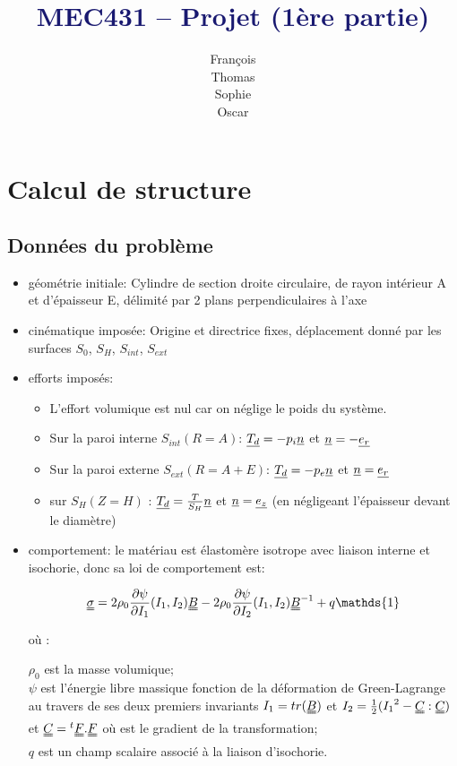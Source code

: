 \documentclass[a4paper,11pt]{article}
\newcommand{\titleinfo}{\textcolor{MidnightBlue}{MEC431 – Projet (1ère partie)}}
\newcommand{\tens}{\uuline}
\begin{document}
\title{\titleinfo}
\author{
	François 
	\\
	Thomas 
	\\
	Sophie 
	\\
	Oscar 
}
\date{}
\maketitle

\section{Calcul de structure}

\subsection{Données du problème}

\begin{itemize}
\item géométrie initiale:
Cylindre de section droite circulaire, de rayon intérieur A et d'épaisseur E, délimité par 2 plans perpendiculaires à l'axe
\item cinématique imposée:
Origine et directrice fixes, déplacement donné par les surfaces $S_{0}$,  $S_H$, $S_{int}$, $S_{ext}$
\item efforts imposés:
	\begin{itemize}
	\item L'effort volumique est nul car on néglige le poids du système.
	\item Sur la paroi interne $S_{int} (R=A)$:  $\uline{T_d} = -p_i \uline{n}$ et $\uline{n} =- \uline{e_r}$
	\item Sur la paroi externe $S_{ext} (R=A+E)$:  $\uline {T_d} = -p_e \uline{n}$ et $\uline{n} = \uline{e_r}$
	\item sur $S_H (Z=H)$ : $\uline{T_d} = \frac{T}{S_H}\uline{n}$ et $\uline{n} = \uline{e_z}$ (en négligeant l'épaisseur devant le diamètre)
	\end{itemize}
\item comportement: le matériau est élastomère isotrope avec liaison interne et isochorie, donc sa loi de comportement est:
\begin{center}
$$
\tens{\sigma}=2\rho_0\frac{\partial\psi}{\partial I_1}(I_1,I_2)\tens{B} -2\rho_0\frac{\partial\psi}{\partial I_2}(I_1,I_2) \tens{B}^{-1}+q\mathds{1}$$
\end{center}
où :
\begin{flushleft}
$\rho_0$ est la masse volumique;\\
$\psi$ est l'énergie libre massique fonction de la déformation de Green-Lagrange \tens{e} au travers de ses deux premiers invariants $I_1= tr(\tens{B})$ et $I_2=\frac{1}{2}({I_1}^2-\tens{C}:\tens{C})$ et $\tens{C} = {}^t\tens{F}.\tens{F}$ où \tens{F} est le gradient de la transformation;
\\
$q$ est un champ scalaire associé à la liaison d'isochorie.
\end{flushleft}
\end{itemize}
\end{document}
